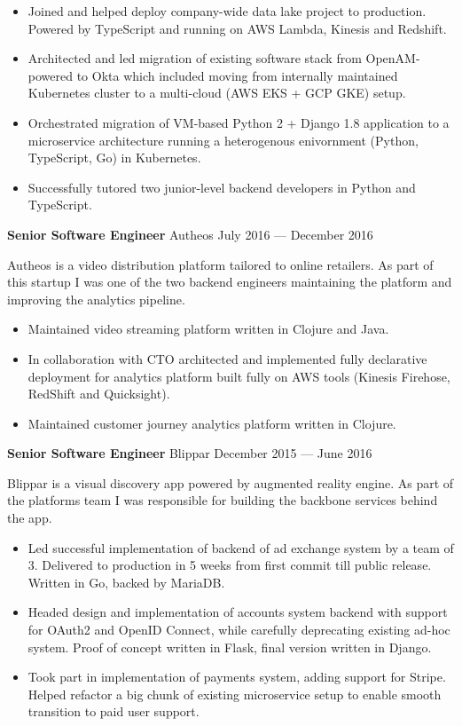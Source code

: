 \documentclass[margin]{res}
\begin{document}
\begin{resume}
\begin{itemize} \itemsep -1pt
\item Joined and helped deploy company-wide data lake project to
  production. Powered by TypeScript and running on AWS Lambda, Kinesis
  and Redshift.
\item Architected and led migration of existing software stack from
  OpenAM-powered to Okta which included moving from internally
  maintained Kubernetes cluster to a multi-cloud (AWS EKS + GCP GKE)
  setup.
\item Orchestrated migration of VM-based Python 2 + Django 1.8
  application to a microservice architecture running a heterogenous
  enivornment (Python, TypeScript, Go) in Kubernetes.
\item Successfully tutored two junior-level backend developers in
  Python and TypeScript.
\end{itemize}

{\bf Senior Software Engineer} Autheos \hfill July 2016 --- December 2016

Autheos is a video distribution platform tailored to online
retailers. As part of this startup I was one of the two backend
engineers maintaining the platform and improving the analytics
pipeline.

\begin{itemize} \itemsep -1pt
\item Maintained video streaming platform written in Clojure and Java.
\item In collaboration with CTO architected and implemented fully
  declarative deployment for analytics platform built fully on AWS
  tools (Kinesis Firehose, RedShift and Quicksight).
\item Maintained customer journey analytics platform written in
  Clojure.
\end{itemize}

{\bf Senior Software Engineer} Blippar \hfill December 2015 --- June 2016

Blippar is a visual discovery app powered by augmented reality
engine. As part of the platforms team I was responsible for building
the backbone services behind the app.

\begin{itemize} \itemsep -1pt
\item Led successful implementation of backend of ad exchange system
  by a team of 3. Delivered to production in 5 weeks from first commit
  till public release. Written in Go, backed by MariaDB.
\item Headed design and implementation of accounts system backend with
  support for OAuth2 and OpenID Connect, while carefully deprecating
  existing ad-hoc system. Proof of concept written in Flask, final
  version written in Django.
\item Took part in implementation of payments system, adding support
  for Stripe. Helped refactor a big chunk of existing microservice
  setup to enable smooth transition to paid user support.
\end{itemize}


\end{resume}
\end{document}
